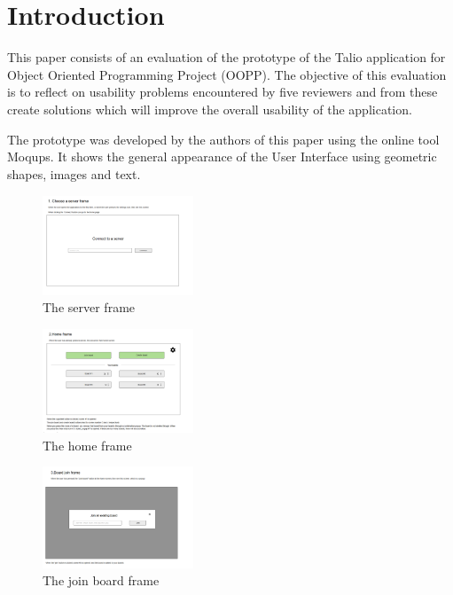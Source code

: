 \section{Introduction}

This paper consists of an evaluation of the prototype of the Talio application for Object Oriented Programming Project (OOPP). The objective of this evaluation is to reflect on usability problems encountered by five reviewers and from these create solutions which will improve the overall usability of the application. 

The prototype was developed by the authors of this paper using the online tool Moqups. It shows the general appearance of the User Interface using geometric shapes, images and text.

\begin{figure}[h]
    \includegraphics[width=0.4\textwidth]{content/images/1.ServerFrame.png}
    \caption{The server frame}
    \label{fig:server-frame}
\end{figure}

\begin{figure}[h]
    \includegraphics[width=0.4\textwidth]{content/images/2.HomeFrame.png}
    \caption{The home frame}
    \label{fig:home-frame}
\end{figure}

\begin{figure}[h]
    \includegraphics[width=0.4\textwidth]{content/images/3.BoardJoin.png}
    \caption{The join board frame}
    \label{fig:board-join}
\end{figure}

